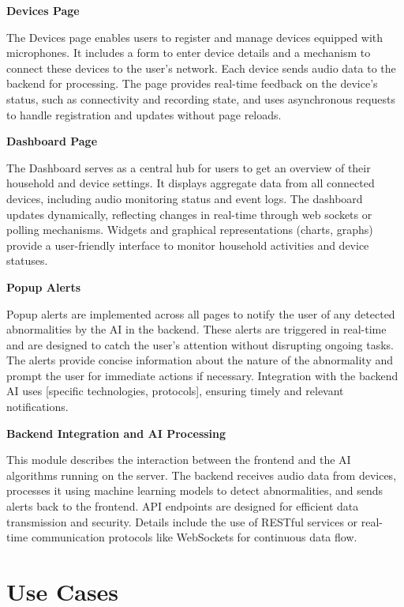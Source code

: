 \documentclass[conference]{IEEEtran}
\begin{document}
\textbf{Devices Page}

The Devices page enables users to register and manage devices equipped with microphones. It includes a form to enter device details and a mechanism to connect these devices to the user’s network. Each device sends audio data to the backend for processing. The page provides real-time feedback on the device’s status, such as connectivity and recording state, and uses asynchronous requests to handle registration and updates without page reloads.
\vspace{0.5cm}

\textbf{Dashboard Page}

The Dashboard serves as a central hub for users to get an overview of their household and device settings. It displays aggregate data from all connected devices, including audio monitoring status and event logs. The dashboard updates dynamically, reflecting changes in real-time through web sockets or polling mechanisms. Widgets and graphical representations (charts, graphs) provide a user-friendly interface to monitor household activities and device statuses.
\vspace{0.5cm}

\textbf{Popup Alerts}

Popup alerts are implemented across all pages to notify the user of any detected abnormalities by the AI in the backend. These alerts are triggered in real-time and are designed to catch the user’s attention without disrupting ongoing tasks. The alerts provide concise information about the nature of the abnormality and prompt the user for immediate actions if necessary. Integration with the backend AI uses [specific technologies, protocols], ensuring timely and relevant notifications.
\vspace{0.5cm}

\textbf{Backend Integration and AI Processing}

This module describes the interaction between the frontend and the AI algorithms running on the server. The backend receives audio data from devices, processes it using machine learning models to detect abnormalities, and sends alerts back to the frontend. API endpoints are designed for efficient data transmission and security. Details include the use of RESTful services or real-time communication protocols like WebSockets for continuous data flow.

\section{Use Cases}
\end{document}
